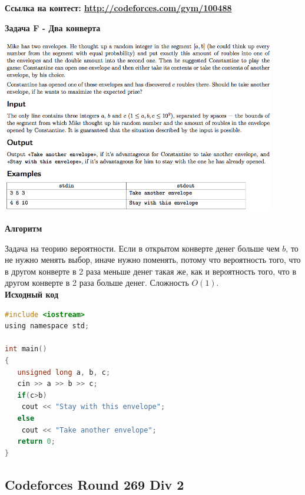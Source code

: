\documentclass[a4paper,12pt]{article}
\begin{document}
\textbf{{\large Ссылка на контест: \url{http://codeforces.com/gym/100488}}}

\newpage
\textbf{{\large Задача F - Два конверта}} \\
\begin{center}
\includegraphics[width=0.9\textwidth]{CT_SGAU/CT_SGAU_F.png}\\ [1cm]
\end{center}

\textbf{{\large Алгоритм}}

Задача на теорию вероятности. Если в открытом конверте денег больше чем $b$, то не нужно менять выбор, иначе нужно поменять, потому что вероятность того, что в другом конверте в 2 раза меньше денег такая же, как и вероятность того, что в другом конверте в 2 раза больше денег. Сложность $O(1)$.\\

\textbf{{\large Исходный код}} \\
\begin{lstlisting}[language=C]
#include <iostream>
using namespace std;

int main()
{
   unsigned long a, b, c;
   cin >> a >> b >> c;
   if(c>b)
	cout << "Stay with this envelope";
   else
	cout << "Take another envelope";
   return 0;
}
\end{lstlisting}


%
%

\newpage
\subsection{Codeforces Round 269 Div 2}
\end{document}
